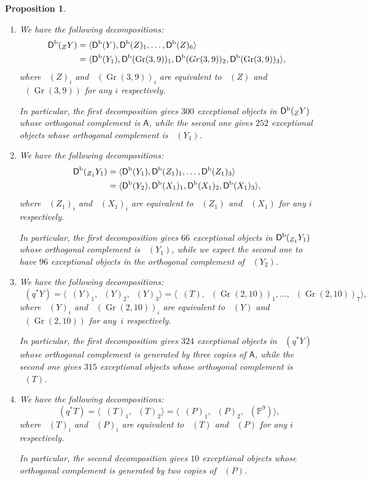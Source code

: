 \documentclass[JEP,XML,SOM,Unicode,NoEqCountersInSection]{cedram}
\newcommand{\NoChangel}[1]{%
\expandafter\let\csname old\string#1\endcsname=#1
\let#1=\relax
\newcommand{#1}{\mathcode`l="716C\csname old\string#1\endcsname\mathcode`l="7160 }%
}
\newcommand{\Bl}{\mathrm{Bl}}\NoChangel{\Bl}
\theoremstyle{plain}
\newtheorem{prop}[theorem]{Proposition}
\theoremstyle{definition}
\newcommand{\cat}[1]{\mathsf{#1}}
\newcommand{\sod}[1]{\langle #1 \rangle}
\DeclareMathOperator{\Db}{{\cat{D}^{\mathrm{b}}}}
\DeclareMathOperator{\Gr}{Gr}
\newcommand{\PP}{\mathbb{P}}
\renewcommand{\theenumi}{\alph{enumi}}
\begin{document}
\skpt
\begin{prop}\label{prop:decos-in-the-diagram}
\begin{enumerate}\renewcommand{\theenumi}{\Alph{enumi}}
\item\label{enum:A}
We have the following decompositions:
\begin{align*}
\Db(\Bl_Z Y) &= \sod{\Db(Y), \Db(Z)_1,\ldots,\Db(Z)_6}\\
&= \sod{\Db(Y_1),\Db(\Gr(3,9))_1,\Db(Gr(3,9))_2,\Db(\Gr(3,9))_3},
\end{align*}
where $\Db(Z)_i$ and $\Db(\Gr(3,9))_i$ are equivalent to $\Db(Z)$ and
$\Db(\Gr(3,9))$ for any $i$ respectively.

In particular, the first decomposition gives $300$ exceptional objects in $\Db(\Bl_Z Y)$
whose orthogonal complement is $\cat{A}$, while the second one gives $252$ exceptional objects
whose orthogonal complement is $\Db(Y_1)$.

\item\label{enum:B}
We have the following decompositions:
\begin{align*}
\Db(\Bl_{Z_1} Y_1) &= \sod{\Db(Y_1), \Db(Z_1)_1,\ldots,\Db(Z_1)_3}\\
&= \sod{\Db(Y_2),\Db(X_1)_1,\Db(X_1)_2,\Db(X_1)_3},
\end{align*}
where $\Db(Z_1)_i$ and $\Db(X_1)_i$ are equivalent to $\Db(Z_1)$ and
$\Db(X_1)$ for any $i$ respectively.

In particular, the first decomposition gives $66$
exceptional objects in $\Db(\Bl_{Z_1} Y_1)$
whose orthogonal complement is $\Db(Y_1)$, while we expect the second one
to have $96$ exceptional objects in the orthogonal complement of $\Db(Y_2)$.

\item\label{enum:C}
We have the following decompositions:
\[
\Db(q^* Y) = \sod{\Db(Y)_1, \Db(Y)_2,\Db(Y)_3}= \sod{\Db(T),\Db(\Gr(2,10))_1,\ldots,\Db(\Gr(2,10))_7},
\]
where $\Db(Y)_i$ and $\Db(\Gr(2,10))_i$ are equivalent to $\Db(Y)$ and
$\Db(\Gr(2,10))$ for any~$i$ respectively.

In particular, the first decomposition gives $324$ exceptional objects in $\Db(q^* Y)$
whose orthogonal complement is generated by three copies of $\cat{A}$, while the second one gives
$315$ exceptional objects whose orthogonal complement is $\Db(T)$.

\item\label{enum:D}
We have the following decompositions:
\[
\Db(q^* T) = \sod{\Db(T)_1, \Db(T)_2}= \sod{\Db(P)_1,\Db(P)_2,\Db(\PP^9)},
\]
where $\Db(T)_i$ and $\Db(P)_i$ are equivalent to $\Db(T)$ and
$\Db(P)$ for any $i$ respectively.

In particular, the second decomposition gives $10$ exceptional objects
whose orthogonal complement is generated by two copies of $\Db(P)$.
\end{enumerate}
\end{prop}
\end{document}
